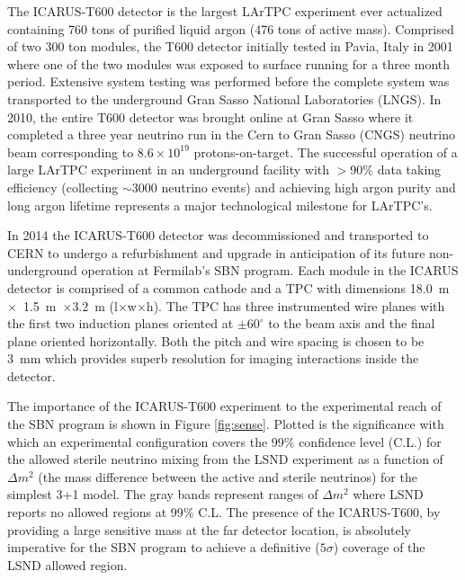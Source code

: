 \label{sec:IF_ICARUS}
The ICARUS-T600 detector is the largest LArTPC experiment ever actualized containing 760 tons of purified liquid argon (476 tons of active mass). Comprised of two 300 ton modules, the T600 detector initially tested in Pavia, Italy in 2001 where one of the two modules was exposed to surface running for a three month period. Extensive system testing was performed before the complete system was transported to the underground Gran Sasso National Laboratories (LNGS). In 2010, the entire T600 detector was brought online at Gran Sasso where it completed a three year neutrino run in the Cern to Gran Sasso (CNGS) neutrino beam corresponding to $8.6 \times 10^{19}$ protons-on-target. The successful operation of a large LArTPC experiment in an underground facility with $>90\%$ data taking efficiency (collecting $\sim$3000 neutrino events) and achieving high argon purity and long argon lifetime represents a major technological milestone for LArTPC's.

In 2014 the ICARUS-T600 detector was decommissioned and transported to CERN to undergo a refurbishment and upgrade in anticipation of its future non-underground operation at Fermilab's SBN program. Each module in the ICARUS detector is comprised of a common cathode and a TPC with dimensions 18.0~m~$\times$~1.5~m~$\times$3.2~m (l$\times$w$\times$h). The TPC has three instrumented wire planes with the first two induction planes oriented at $\pm 60^{\circ}$ to the beam axis and the final plane oriented horizontally. Both the pitch and wire spacing is chosen to be 3~mm which provides superb resolution for imaging interactions inside the detector. 


The importance of the ICARUS-T600 experiment to the experimental reach of the SBN program is shown in Figure \ref{fig:sense}. Plotted is the significance with which an experimental configuration covers the 99$\%$ confidence level (C.L.) for the allowed sterile neutrino mixing from the LSND experiment as a function of $\Delta m^{2}$ (the mass difference between the active and sterile neutrinos) for the simplest 3+1 model. The gray bands represent ranges of $\Delta m^{2}$ where LSND reports no allowed regions at 99$\%$ C.L. The presence of the ICARUS-T600, by providing a large sensitive mass at the far detector location, is absolutely imperative for the SBN program to achieve a definitive ($5\sigma$) coverage of the LSND allowed region.


